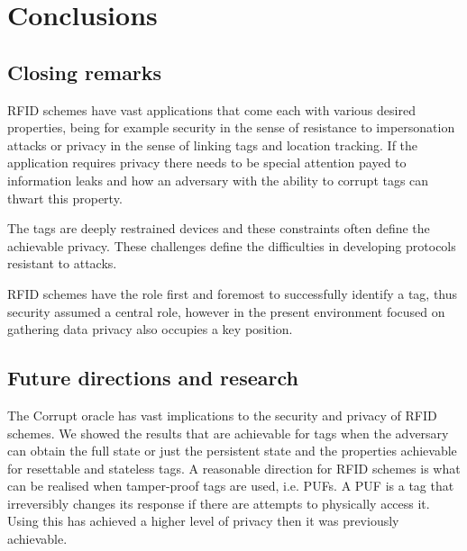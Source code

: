 \chapter*{Conclusions} 

\section*{Closing remarks}
RFID schemes have vast applications that come each with various desired properties, being for example security in the sense of resistance to impersonation attacks 
or privacy in the sense of linking tags and location tracking. If the application requires privacy there needs to be special attention payed to information leaks
and how an adversary with the ability to corrupt tags can thwart this property.

The tags are deeply restrained devices and these constraints often define the achievable privacy. These challenges define the difficulties in developing protocols
resistant to attacks.

RFID schemes have the role first and foremost to successfully identify a tag, thus security assumed a central role, however in the present environment focused on 
gathering data privacy also occupies a key position.

\section*{Future directions and research}
The Corrupt oracle has vast implications to the security and privacy of RFID schemes. We showed the results that are achievable for tags
when the adversary can obtain the full state or just the persistent state and the properties achievable for resettable and stateless tags.
A reasonable direction for RFID schemes is what can be realised when tamper-proof tags are used, i.e. PUFs. A PUF is a tag that irreversibly changes 
its response if there are attempts to physically access it. Using this \cite{PUFs} has achieved a higher level of privacy then it was 
previously achievable.
